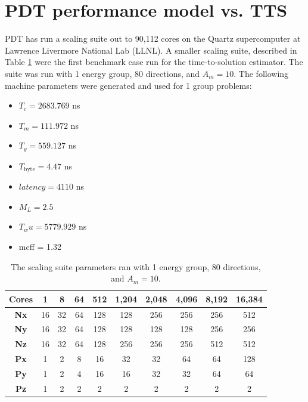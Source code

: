\section{PDT performance model vs. TTS}

PDT has run a scaling suite out to 90,112 cores on the Quartz supercomputer \cite{quartz} at Lawrence Livermore National Lab (LLNL). 
A smaller scaling suite, described in Table \ref{scaling_suite} were the first benchmark case run for the time-to-solution estimator. 
The suite was run with 1 energy group, 80 directions, and $A_m = 10$. 
The following machine parameters were generated and used for 1 group problems:
\begin{itemize}
  \item $T_c = 2683.769$ ns
  \item $T_m = 111.972$ ns
  \item $T_g = 559.127$ ns
  \item $T_\text{byte} = 4.47$ ns
  \item $latency = 4110$ ns
  \item $M_L = 2.5$
  \item $T_wu = 5779.929$ ns
  \item mcff = 1.32
\end{itemize}

\begin{table}[H]
  \centering
  \begin{tabular}{c|c|c|c|c|c|c|c|c|c}
    \textbf{Cores} & 1 & 8 & 64 & 512 & 1,204 & 2,048 & 4,096 & 8,192 & 16,384 \\ \hline
    \textbf{Nx} & 16 & 32 & 64 & 128 & 128 & 256 & 256 & 256 & 512 \\ \hline
    \textbf{Ny} & 16 & 32 & 64 & 128 & 128 & 128 & 128 & 256 & 256 \\ \hline
    \textbf{Nz} & 16 & 32 & 64 & 128 & 256 & 256 & 256 & 512 & 512 \\ \hline
    \textbf{Px} & 1  & 2  & 8  & 16  & 32  & 32  & 64  & 64  & 128 \\ \hline
    \textbf{Py} & 1  & 2  & 4  & 16  & 16  & 32  & 32  & 64  & 64  \\ \hline
    \textbf{Pz} & 1  & 2  & 2  & 2   & 2   & 2   & 2   & 2   & 2   \\ 
  \end{tabular}
  \caption{The scaling suite parameters ran with 1 energy group, 80 directions, and $A_m = 10$.}
  \label{scaling_suite}
\end{table}

